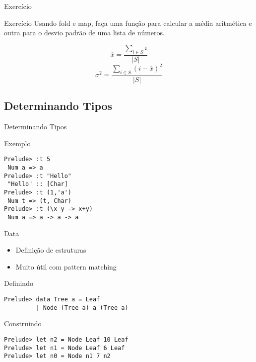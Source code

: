 \documentclass{beamer}
\begin{document}
	\begin{frame}{Exercício}
	 \begin{block}{Exercício}
	  Usando fold e map, faça uma função para calcular a média aritmética e outra para o desvio padrão de uma lista de números. 
	 \end{block}
	 
	  \[ \overline{x} = \frac{\sum\limits_{i \in S}i}{\left|S\right|} \]
	  \[ \sigma^2 = \frac{\sum\limits_{i \in S}(i - \overline{x})^2}{\left|S\right|} \]	 

	\end{frame}
	
	\subsection{Determinando Tipos}
		\begin{frame}[fragile]{Determinando Tipos}
		 \begin{block}{Exemplo}
		 \begin{lstlisting}
Prelude> :t 5
 Num a => a
Prelude> :t "Hello"
 "Hello" :: [Char]
Prelude> :t (1,'a')
 Num t => (t, Char)
Prelude> :t (\x y -> x+y)
 Num a => a -> a -> a
		 \end{lstlisting}
		 \end{block}
		\end{frame}
	
		\begin{frame}[fragile]{Data}
		 
		 \begin{itemize}
		  \item Definição de estruturas
		  \item Muito útil com pattern matching
		 \end{itemize}
		 
		 \begin{block}{Definindo}
		  \begin{lstlisting}
Prelude> data Tree a = Leaf 
         | Node (Tree a) a (Tree a)
		  \end{lstlisting}
		 \end{block}		 
		 \begin{block}{Construindo}
		  \begin{lstlisting}
Prelude> let n2 = Node Leaf 10 Leaf
Prelude> let n1 = Node Leaf 6 Leaf
Prelude> let n0 = Node n1 7 n2
		  \end{lstlisting}
		 \end{block}
		\end{frame}
		
\end{document}
